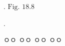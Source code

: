 
\begin{questionbox}{\thechapter. \QuestionNumberumber}
$\text{Fig. 18.8}$
\end{questionbox}

\begin{solbox}{\thechapter. \QuestionNumberumber}
\bnset
{}


\bn \zzz

\bnset
{}
\bn \zzz

\bnset
{}
\bn \zzz

 ㅇㅇ \zzz
{} ㅇㅇ \zzz
{} ㅇㅇ \zzz
{} ㅇㅇ
\end{solbox}
\clearpage
